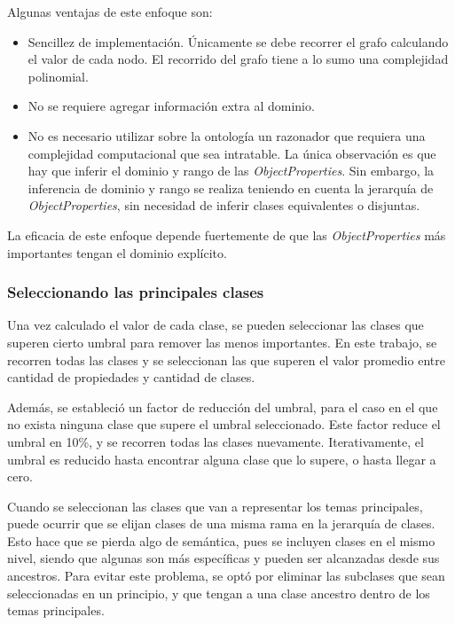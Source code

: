 Algunas ventajas de este enfoque son:
\begin{itemize}
    \item Sencillez de implementación. Únicamente se debe recorrer el grafo calculando el valor de cada nodo. El recorrido del grafo tiene a lo sumo una complejidad polinomial.
    \item No se requiere agregar información extra al dominio.
    \item No es necesario utilizar sobre la ontología un razonador que requiera una complejidad computacional que sea intratable. La única observación es que hay que inferir el dominio y rango de las \emph{ObjectProperties}. Sin embargo, la inferencia de dominio y rango se realiza teniendo en cuenta la jerarquía de \emph{ObjectProperties}, sin necesidad de inferir clases equivalentes o disjuntas.
\end{itemize}

La eficacia de este enfoque depende fuertemente de que las \emph{ObjectProperties} más importantes tengan el dominio explícito.


\subsubsection{Seleccionando las principales clases}
\label{sec:select_class}
Una vez calculado el valor de cada clase, se pueden seleccionar las clases que superen cierto umbral para remover las menos importantes. En este trabajo, se recorren todas las clases y se seleccionan las que superen el valor promedio entre cantidad de propiedades y cantidad de clases.

Además, se estableció un factor de reducción del umbral, para el caso en el que no exista ninguna clase que supere el umbral seleccionado. Este factor reduce el umbral en 10\%, y se recorren todas las clases nuevamente. Iterativamente, el umbral es reducido hasta encontrar alguna clase que lo supere, o hasta llegar a cero.

Cuando se seleccionan las clases que van a representar los temas principales, puede ocurrir que se elijan clases de una misma rama en la jerarquía de clases. Esto hace que se pierda algo de semántica, pues se incluyen clases en el mismo nivel, siendo que algunas son más específicas y pueden ser alcanzadas desde sus ancestros. Para evitar este problema, se optó por eliminar las subclases que sean seleccionadas en un principio, y que tengan a una clase ancestro dentro de los temas principales.


